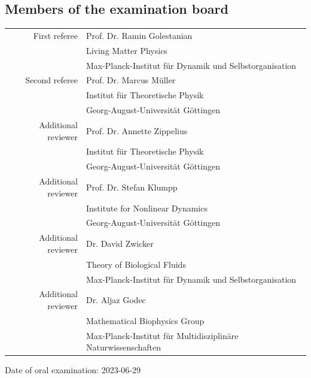 \subsection*{Members of the examination board}
{
	\begin{tabular}{rl}
		First referee & Prof. Dr. Ramin Golestanian \\
		& Living Matter Physics \\
		& Max-Planck-Institut für Dynamik und Selbstorganisation \vspace*{0.25cm} \\
		Second referee & Prof. Dr. Marcus Müller \\
		& Institut für Theoretische Physik \\ & Georg-August-Universität Göttingen \vspace*{0.25cm} \\
		Additional reviewer & Prof. Dr. Annette Zippelius \\
		& Institut für Theoretische Physik \\ & Georg-August-Universität Göttingen \vspace*{0.25cm} \\
		Additional reviewer & Prof. Dr. Stefan Klumpp \\
		& Institute for Nonlinear Dynamics \\ & Georg-August-Universität Göttingen \vspace*{0.25cm} \\
		Additional reviewer & Dr. David Zwicker \\
		& Theory of Biological Fluids \\ & Max-Planck-Institut für Dynamik und Selbstorganisation \vspace*{0.25cm} \\
		Additional reviewer & Dr. Aljaz Godec \\
		& Mathematical Biophysics Group \\ & Max-Planck-Institut für Multidisziplinäre Naturwissenschaften \vspace*{1.2cm} \\
	\end{tabular}
}

Date of oral examination: 2023-06-29